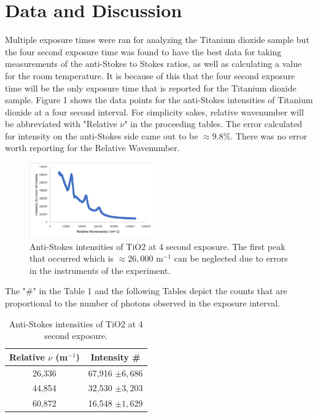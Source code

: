 \documentclass[twocolumn]{article}
\begin{document}
\section*{Data and Discussion}
Multiple exposure times were ran for analyzing the Titanium dioxide sample but the four second exposure time was found to have the best data for taking measurements of the anti-Stokes to Stokes ratios, as well as calculating a value for the room temperature. It is because of this that the four second exposure time will be the only exposure time that is reported for the Titanium dioxide sample. Figure 1 shows the data points for the anti-Stokes intensities of Titanium dioxide at a four second interval. For simplicity sakes, relative wavenumber will be abbreviated with "Relative $\nu$" in the proceeding tables. The error calculated for intensity on the anti-Stokes side came out to be $\approx 9.8\%$. There was no error worth reporting for the Relative Wavenumber.
\begin{figure}[htb]
\centering
\includegraphics[width=0.48\textwidth]{Figures/PHYS 331 RS TiO2 Anti-Stokes Relative Wavenumber (4 Sec).png}
\caption{Anti-Stokes intensities of TiO2 at 4 second exposure. The first peak that occurred which is $\approx 26,000$  m$^{-1}$ can be neglected due to errors in the instruments of the experiment.}
\end{figure}
\newline
The "$\#$" in the Table 1 and the following Tables depict the counts that are proportional to the number of photons observed in the exposure interval.
\begin{table}[htb]
\begin{center}
\begin{tabular}{|c|c|}
    \hline \textbf{Relative $\nu$ (m$^{-1}$)} & \textbf{Intensity \#} \\ \hline
    26,336 & 67,916 $\pm 6,686$ \\ \hline
    44,854 & 32,530 $\pm 3,203$ \\ \hline
    60,872 & 16,548 $\pm 1,629$ \\ \hline
\end{tabular}
\caption{\small{Anti-Stokes intensities of TiO2 at 4 second exposure.}}
\end{center}
\label{default}
\end{table}%
\end{document}
